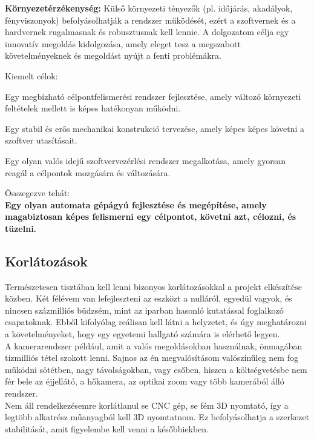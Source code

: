 \documentclass[12pt,a4paper]{article}
\begin{document}
\textbf{Környezetérzékenység:} Külső környezeti tényezők (pl. időjárás, akadályok, fényviszonyok) befolyásolhatják a rendszer működését, ezért a szoftvernek és a hardvernek rugalmasnak és robusztusnak kell lennie. A dolgozatom célja egy innovatív megoldás kidolgozása, amely eleget tesz a megszabott követelményeknek és megoldást nyújt a fenti problémákra. \\

\pagebreak

Kiemelt célok:
\begin{list}{}{}
	\item Egy megbízható célpontfelismerési rendszer fejlesztése, amely változó környezeti feltételek mellett is képes hatékonyan működni.
	\item Egy stabil és erős mechanikai konstrukció tervezése, amely képes képes követni a szoftver utasításait.
	\item Egy olyan valós idejű szoftvervezérlési rendszer megalkotása, amely gyorsan reagál a célpontok mozgására és változására.
\end{list}

Összegezve tehát: \\

 \textbf{Egy olyan automata gépágyú fejlesztése és megépítése, amely magabiztosan képes felismerni egy célpontot, követni azt, célozni, és tüzelni.}

\subsection{Korlátozások}

Természetesen tisztában kell lenni bizonyos korlátozásokkal a projekt elkészítése közben. Két félévem van lefejleszteni az eszközt a nulláról, egyedül vagyok, és nincsen százmilliós büdzsém, mint az iparban hasonló kutatással foglalkozó csapatoknak. Ebből kifolyólag reálisan kell látni a helyzetet, és úgy meghatározni a követelményeket, hogy egy egyetemi hallgató számára is elérhető legyen. \\

A kamerarendszer például, amit a valós megoldásokban használnak, önmagában tízmilliós tétel szokott lenni. Sajnos az én megvalósításom valószínűleg nem fog működni sötétben, nagy távolságokban, vagy esőben, hiszen a költségvetésbe nem fér bele az éjjellátó, a hőkamera, az optikai zoom vagy több kamerából álló rendszer.\\

Nem áll rendelkezésemre korlátlanul se CNC gép, se fém 3D nyomtató, így a legtöbb alkatrész műanyagból kell 3D nyomtatnom. Ez befolyásolhatja a szerkezet stabilitását, amit figyelembe kell venni a későbbiekben.\\
\end{document}
